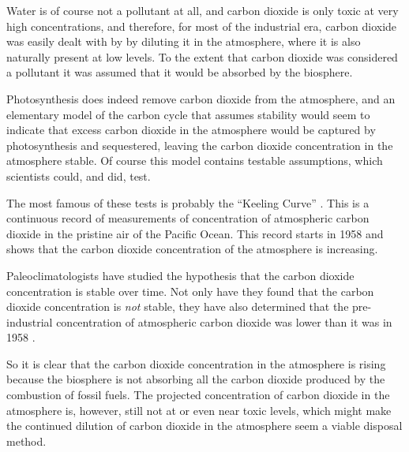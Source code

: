 Water is of course not a pollutant at all, and carbon dioxide is only toxic at
very high concentrations, and therefore, for most of the industrial era, carbon
dioxide was easily dealt with by by diluting it in the atmosphere, where it is
also naturally present at low levels. To the extent that carbon dioxide was
considered a pollutant it was assumed that it would be absorbed by the
biosphere.

Photosynthesis does indeed remove carbon dioxide from the atmosphere, and an
elementary model of the carbon cycle that assumes stability would seem to
indicate that excess carbon dioxide in the atmosphere would be captured by
photosynthesis and sequestered, leaving the carbon dioxide concentration in the
atmosphere stable. Of course this model contains testable assumptions, which
scientists could, and did, test.

The most famous of these tests is probably the ``Keeling Curve''
\autocite{Harris2010}. This is a continuous record of measurements of
concentration of atmospheric carbon dioxide in the pristine air of the Pacific
Ocean. This record starts in 1958 and shows that the carbon dioxide
concentration of the atmosphere is increasing.

Paleoclimatologists have studied the hypothesis that the carbon dioxide
concentration is stable over time. Not only have they found that the carbon
dioxide concentration is \emph{not} stable, they have also determined that the
pre-industrial concentration of atmospheric carbon dioxide was lower than it was
in 1958 \autocite{Petit1999}.

So it is clear that the carbon dioxide concentration in the atmosphere is rising
because the biosphere is not absorbing all the carbon dioxide produced by the
combustion of fossil fuels. The projected concentration of carbon dioxide in the
atmosphere is, however, still not at or even near toxic levels, which might make
the continued dilution of carbon dioxide in the atmosphere seem a viable
disposal method.

